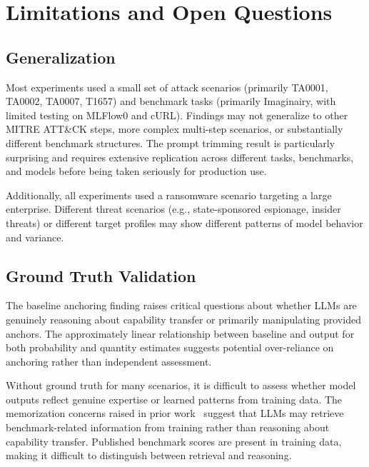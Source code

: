 \documentclass[midterm]{sparreport}
\begin{document}
\FloatBarrier

\section{Limitations and Open Questions}

\subsection{Generalization}

Most experiments used a small set of attack scenarios (primarily TA0001, TA0002, TA0007, T1657) and benchmark tasks (primarily Imaginairy, with limited testing on MLFlow0 and cURL). Findings may not generalize to other MITRE ATT\&CK steps, more complex multi-step scenarios, or substantially different benchmark structures. The prompt trimming result is particularly surprising and requires extensive replication across different tasks, benchmarks, and models before being taken seriously for production use.

Additionally, all experiments used a ransomware scenario targeting a large enterprise. Different threat scenarios (e.g., state-sponsored espionage, insider threats) or different target profiles may show different patterns of model behavior and variance.

\subsection{Ground Truth Validation}

The baseline anchoring finding raises critical questions about whether LLMs are genuinely reasoning about capability transfer or primarily manipulating provided anchors. The approximately linear relationship between baseline and output for both probability and quantity estimates suggests potential over-reliance on anchoring rather than independent assessment.

Without ground truth for many scenarios, it is difficult to assess whether model outputs reflect genuine expertise or learned patterns from training data. The memorization concerns raised in prior work~\cite{leung2024memorization} suggest that LLMs may retrieve benchmark-related information from training rather than reasoning about capability transfer. Published benchmark scores are present in training data, making it difficult to distinguish between retrieval and reasoning.
\end{document}
